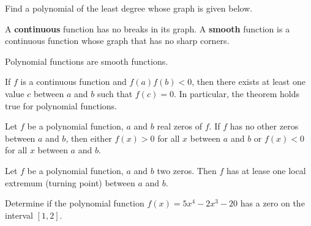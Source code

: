 \begin{example}
  Find a polynomial of the least degree whose graph is given below.\\
\end{example}

\newpage

\begin{definition}
  A \textbf{continuous} function has no breaks in its graph. A \textbf{smooth} function is a continuous function whose graph that has no sharp corners.
\end{definition}
\begin{note}
  Polynomial functions are smooth functions.
\end{note}

\begin{theorem}
  If $f$ is a continuous function and $f(a)f(b)<0$, then there exists at least one value $c$ between $a$ and $b$ such that $f(c)=0$. In particular, the theorem holds true for polynomial functions. 
\end{theorem}
  
\begin{corollary}
  Let $f$ be a polynomial function, $a$ and $b$ real zeros of $f$. If $f$ has no other zeros between $a$ and $b$, then either $f(x)>0$ for all $x$ between $a$ and $b$ or $f(x)<0$ for all $x$ between $a$ and $b$.
\end{corollary}

\begin{theorem}
  Let $f$ be a polynomial function, $a$ and $b$ two zeros. Then $f$ has at lease one local extremum (turning point) between $a$ and $b$.
\end{theorem}
  
\begin{example}
  Determine if the polynomial function $f(x)=5x^4-2x^3-20$ has a zero on the interval $[1, 2]$.
\end{example}

